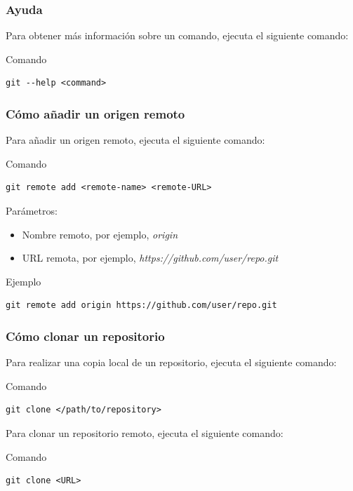 \documentclass{beamer}
\begin{document}
\begin{frame}[fragile]
\frametitle{Ayuda}
Para obtener más información sobre un comando, ejecuta el siguiente comando:
\begin{block}{Comando}
\begin{verbatim}
git --help <command>
\end{verbatim}
\end{block}
\end{frame}

\begin{frame}[fragile]
\frametitle{Cómo añadir un origen remoto}
Para añadir un origen remoto, ejecuta el siguiente comando:
\begin{block}{Comando}
\begin{verbatim}
git remote add <remote-name> <remote-URL>
\end{verbatim}
\end{block}
\vskip 1.0cm
Parámetros:
\begin{itemize}
\item Nombre remoto, por ejemplo, \textit{origin}
\item URL remota, por ejemplo, \textit{https://github.com/user/repo.git}
\end{itemize}
\begin{block}{Ejemplo}
\begin{verbatim}
git remote add origin https://github.com/user/repo.git
\end{verbatim}
\end{block}
\end{frame}

\begin{frame}[fragile]
\frametitle{Cómo clonar un repositorio}
Para realizar una copia local de un repositorio, ejecuta el siguiente comando:
\begin{block}{Comando}
\begin{verbatim}
git clone </path/to/repository>
\end{verbatim}
\end{block}
\vskip 1.0cm
Para clonar un repositorio remoto, ejecuta el siguiente comando:
\begin{block}{Comando}
\begin{verbatim}
git clone <URL>
\end{verbatim}
\end{block}
\end{frame}
\end{document}

